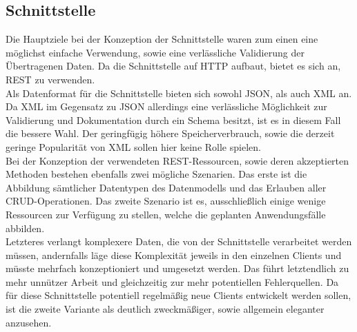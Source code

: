 \subsection{Schnittstelle}
Die Hauptziele bei der Konzeption der Schnittstelle waren zum einen eine möglichst
einfache Verwendung, sowie eine verlässliche Validierung der Übertragenen Daten.
Da die Schnittstelle auf HTTP aufbaut, bietet es sich an, REST zu verwenden. \\

Als Datenformat für die Schnittstelle bieten sich sowohl JSON, als auch XML an.
Da XML im Gegensatz zu JSON allerdings eine verlässliche Möglichkeit zur Validierung
und Dokumentation durch ein Schema besitzt, ist es in diesem Fall die bessere Wahl.
Der geringfügig höhere Speicherverbrauch, sowie die derzeit geringe Popularität
von XML sollen hier keine Rolle spielen. \\

Bei der Konzeption der verwendeten REST-Ressourcen, sowie deren akzeptierten Methoden
bestehen ebenfalls zwei mögliche Szenarien. Das erste ist die Abbildung sämtlicher
Datentypen des Datenmodells und das Erlauben aller CRUD-Operationen.
Das zweite Szenario ist es, ausschließlich einige wenige Ressourcen zur Verfügung
zu stellen, welche die geplanten Anwendungsfälle abbilden. \\

Letzteres verlangt komplexere Daten, die von der Schnittstelle verarbeitet werden müssen,
andernfalls läge diese Komplexität jeweils in den einzelnen Clients und müsste
mehrfach konzeptioniert und umgesetzt werden. Das führt letztendlich zu mehr
unnützer Arbeit und gleichzeitig zur mehr potentiellen Fehlerquellen.
Da für diese Schnittstelle potentiell regelmäßig neue Clients entwickelt werden sollen,
ist die zweite Variante als deutlich zweckmäßiger, sowie allgemein eleganter anzusehen.
